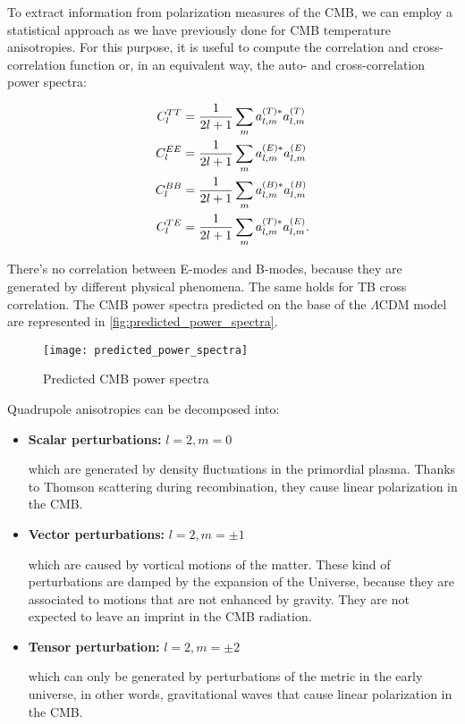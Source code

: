 To extract information from polarization measures of the CMB, we can employ
a statistical approach as we have previously done for CMB temperature anisotropies.
For this purpose, it is useful to compute the correlation and cross-correlation
function or, in an equivalent way, the auto- and cross-correlation power
spectra:

\begin{align}
        C^{TT}_l & = \frac{1}{2l + 1}\sum_m
        a^{\qty(T)*}_{l,m} a^{\qty(T)}_{l,m} \\
        C^{EE}_l & = \frac{1}{2l + 1}\sum_m
        a^{\qty(E)*}_{l,m} a^{\qty(E)}_{l,m} \\
        C^{BB}_l & = \frac{1}{2l + 1}\sum_m
        a^{\qty(B)*}_{l,m} a^{\qty(B)}_{l,m} \\
        C^{TE}_l & = \frac{1}{2l + 1}\sum_m
        a^{\qty(T)*}_{l,m} a^{\qty(E)}_{l,m}.
\end{align}

There's no correlation between E-modes and B-modes, because they are
generated by different physical phenomena. The same holds for TB cross
correlation. The CMB power spectra predicted on the base of the
$\Lambda$CDM model are represented in
\autoref{fig:predicted_power_spectra}.

\begin{figure}
        \centering
        \texttt{[image: predicted\_power\_spectra]}
        \caption{Predicted CMB power spectra}
        \label{fig:predicted_power_spectra}
\end{figure}

Quadrupole anisotropies can be decomposed into:

\begin{itemize}
        \item \textbf{Scalar perturbations:} $l = 2, m = 0$

        which are generated by density fluctuations in the primordial
        plasma. Thanks to Thomson scattering during recombination, they
        cause linear polarization in the CMB.

        \item \textbf{Vector perturbations:} $l = 2, m = \pm 1$

        which are caused by vortical motions of the matter. These kind of
        perturbations are damped by the expansion of the Universe, because
        they are associated to motions that are not enhanced by gravity.
        They are not expected to leave an imprint in the CMB radiation.

        \item \textbf{Tensor perturbation:} $l = 2, m = \pm 2$

        which can only be generated by perturbations of the metric in the
        early universe, in other words, gravitational waves that cause
        linear polarization in the CMB.
\end{itemize}

